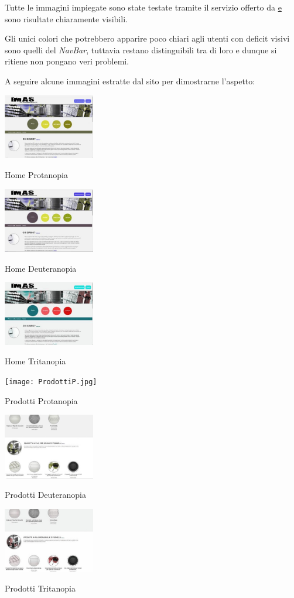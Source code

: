 \documentclass[11pt]{article}
\begin{document}
Tutte le immagini impiegate sono state testate tramite il servizio offerto da \href{http://www.color-blindness.com/coblis-color-blindness-simulator/} e sono risultate chiaramente visibili.

Gli unici colori che potrebbero apparire poco chiari agli utenti con deficit visivi sono quelli del \textit{NavBar}, tuttavia restano distinguibili tra di loro e dunque si ritiene non pongano veri problemi.

A seguire alcune immagini estratte dal sito per dimostrarne l'aspetto:

\includegraphics[width=0.3\textwidth]{HomeP.png}
\caption{Home Protanopia}
\includegraphics[width=0.3\textwidth]{HomeD.jpg}
\caption{Home Deuteranopia}
\includegraphics[width=0.3\textwidth]{HomeT.jpg}
\caption{Home Tritanopia}

\texttt{[image: ProdottiP.jpg]}
\caption{Prodotti Protanopia}
\includegraphics[width=0.3\textwidth]{ProdottiD.jpg}
\caption{Prodotti Deuteranopia}
\includegraphics[width=0.3\textwidth]{ProdottiT.jpg}
\caption{Prodotti Tritanopia}
\end{document}
